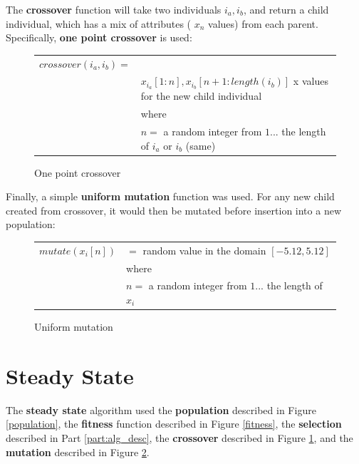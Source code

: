 \documentclass[12pt]{article}
\begin{document}
The \textbf{crossover} function will take two individuals $ i_a, i_b $, and return a child individual, which has a mix of attributes ( $x_n $ values) from each parent. Specifically, \textbf{one point crossover} is used:
\begin{figure}[!h]
        \begin{center}
		\begin{tabular}{r l}
	                $ crossover(i_a, i_b) = $ & \\
			& $ x_{i_a}[1:n], x_{i_b}[n + 1:length(i_b)] $ x values for the new child individual \\
								& where \\
								& $ n = $ a random integer from $ 1 ... $ the length of $ i_a $ or $ i_b$ (same)
		\end{tabular} 
               	\caption{One point crossover}
                \label{one_crossover}
        \end{center}
\end{figure}

Finally, a simple \textbf{uniform mutation} function was used. For any new child created from crossover, it would then be mutated before insertion into a new population:
\begin{figure}[!h]
        \begin{center}
		\begin{tabular}{r l}
	                $ mutate(x_i[n]) $ 		& $ = $ random value in the domain $ [-5.12, 5.12] $\\
								& where \\
								& $ n = $ a random integer from $ 1 ... $ the length of $x_i$
		\end{tabular} 
               	\caption{Uniform mutation}
                \label{uniform_mutation}
        \end{center}
\end{figure}

\section{Steady State}
The \textbf{steady state} algorithm used the \textbf{population} described in Figure \ref{population}, the \textbf{fitness} function described in Figure \ref{fitness}, the \textbf{selection} described in Part \ref{part:alg_desc}, the \textbf{crossover} described in Figure \ref{one_crossover}, and the \textbf{mutation} described in Figure \ref{uniform_mutation}.
\end{document}
